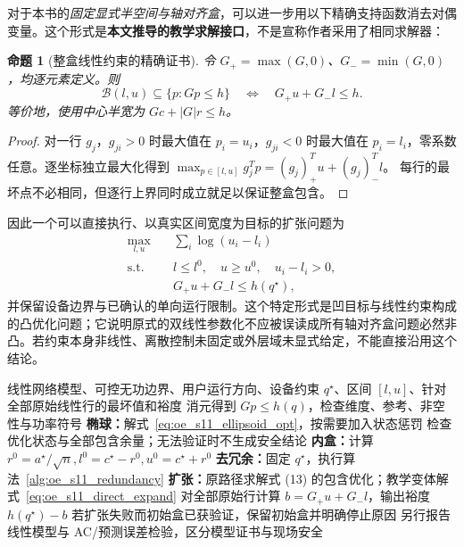 \documentclass[UTF8,11pt,fontset=fandol,openany,oneside]{ctexbook}
\newtheorem{proposition}[theorem]{命题}
\theoremstyle{definition}
\theoremstyle{remark}
\numberwithin{equation}{chapter}
\begin{document}
对于本书的\emph{固定显式半空间与轴对齐盒}，可以进一步用以下精确支持函数消去对偶变量。这个形式是\textbf{本文推导的教学求解接口}，不是宣称作者采用了相同求解器：
\begin{proposition}[整盒线性约束的精确证书]
令 $G_+=\max(G,0)$、$G_-=\min(G,0)$，均逐元素定义。则
\begin{equation}
 \mathcal B(l,u)\subseteq\{p:Gp\le h\}
 \quad\Longleftrightarrow\quad
 G_+u+G_-l\le h.
 \label{eq:oe_s11_box_exact}
\end{equation}
等价地，使用中心半宽为 $Gc+|G|r\le h$。
\end{proposition}
\begin{proof}
对一行 $g_j$，$g_{ji}>0$ 时最大值在 $p_i=u_i$，$g_{ji}<0$ 时最大值在 $p_i=l_i$，零系数任意。逐坐标独立最大化得到
$\max_{p\in[l,u]}g_j^Tp=(g_j)_+^Tu+(g_j)_-^Tl$。
每行的最坏点不必相同，但逐行上界同时成立就足以保证整盒包含。
\end{proof}

因此一个可以直接执行、以真实区间宽度为目标的扩张问题为
\begin{equation}
 \begin{aligned}
 \max_{l,u}\quad &\sum_i\log(u_i-l_i)\\
 \text{s.t.}\quad &l\le l^0,\quad u\ge u^0,\quad u_i-l_i>0,\\
 &G_+u+G_-l\le h(q^\star),
 \end{aligned}
 \label{eq:oe_s11_direct_expand}
\end{equation}
并保留设备边界与已确认的单向运行限制。这个特定形式是凹目标与线性约束构成的凸优化问题；它说明原式的双线性参数化不应被误读成所有轴对齐盒问题必然非凸。若约束本身非线性、离散控制未固定或外层域未显式给定，不能直接沿用这个结论。

\begin{algorithm}[tbp]
\caption{S11 的四步教学算法：原方法主线与显式盒求解变体}
\label{alg:oe_s11_all}
\begin{algorithmic}[1]
\Require 线性网络模型、可控无功边界、用户运行方向、设备约束
\Ensure $q^\star$、区间 $[l,u]$、针对全部原始线性行的最坏值和裕度
\State 消元得到 $Gp\le h(q)$，检查维度、参考、非空性与功率符号
\State \textbf{椭球：}解式~\eqref{eq:oe_s11_ellipsoid_opt}，按需要加入状态惩罚
\State 检查优化状态与全部包含余量；无法验证时不生成安全结论
\State \textbf{内盒：}计算 $r^0=a^\star/\sqrt n,l^0=c^\star-r^0,u^0=c^\star+r^0$
\State \textbf{去冗余：}固定 $q^\star$，执行算法~\ref{alg:oe_s11_redundancy}
\State \textbf{扩张：}原路径求解式 (13) 的包含优化；教学变体解式~\eqref{eq:oe_s11_direct_expand}
\State 对全部原始行计算 $b=G_+u+G_-l$，输出裕度 $h(q^\star)-b$
\State 若扩张失败而初始盒已获验证，保留初始盒并明确停止原因
\State 另行报告线性模型与 AC/预测误差检验，区分模型证书与现场安全
\end{algorithmic}
\end{algorithm}
\end{document}
